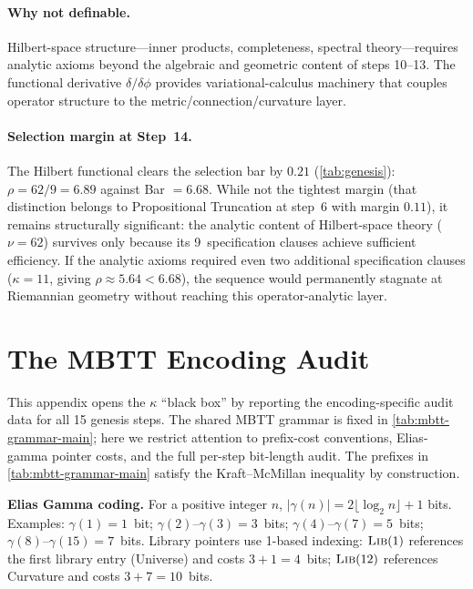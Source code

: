 \documentclass[11pt,a4paper]{article}
\theoremstyle{plain}
\theoremstyle{definition}
\theoremstyle{remark}
\begin{document}
\paragraph{Why not definable.}
Hilbert-space structure---inner products, completeness, spectral theory---requires analytic axioms beyond the algebraic and geometric content of steps 10--13.
The functional derivative $\delta/\delta\phi$ provides variational-calculus machinery that couples operator structure to the metric/connection/curvature layer.

\paragraph{Selection margin at Step~14.}
The Hilbert functional clears the selection bar by $0.21$ (\cref{tab:genesis}): $\rho = 62/9 = 6.89$ against Bar $= 6.68$.
While not the tightest margin (that distinction belongs to Propositional Truncation at step~6 with margin $0.11$), it remains structurally significant: the analytic content of Hilbert-space theory ($\nu = 62$) survives only because its 9~specification clauses achieve sufficient efficiency.
If the analytic axioms required even two additional specification clauses ($\kappa = 11$, giving $\rho \approx 5.64 < 6.68$), the sequence would permanently stagnate at Riemannian geometry without reaching this operator-analytic layer.

\section{The MBTT Encoding Audit}
\label{sec:mbtt-audit}

This appendix opens the $\kappa$ ``black box'' by reporting the encoding-specific audit data for all 15 genesis steps.
The shared MBTT grammar is fixed in \cref{tab:mbtt-grammar-main}; here we restrict attention to prefix-cost conventions, Elias-gamma pointer costs, and the full per-step bit-length audit.
The prefixes in \cref{tab:mbtt-grammar-main} satisfy the Kraft--McMillan inequality by construction.

\noindent\textbf{Elias Gamma coding.}
For a positive integer $n$, $|\gamma(n)| = 2\lfloor \log_2 n \rfloor + 1$ bits.
Examples: $\gamma(1) = 1$~bit; $\gamma(2)\text{--}\gamma(3) = 3$~bits; $\gamma(4)\text{--}\gamma(7) = 5$~bits; $\gamma(8)\text{--}\gamma(15) = 7$~bits.
Library pointers use 1-based indexing: $\textsc{Lib}(1)$ references the first library entry (Universe) and costs $3 + 1 = 4$~bits; $\textsc{Lib}(12)$ references Curvature and costs $3 + 7 = 10$~bits.
\end{document}
